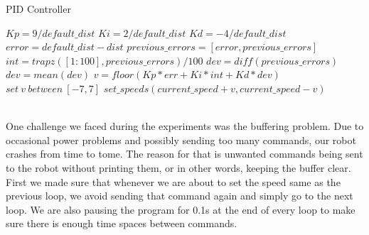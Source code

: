 \documentclass[]{article}
\begin{document}
\begin{center}
\begin{algorithm}                      %
\caption{PID Controller}          %
\label{alg1}                           %
\begin{algorithmic}                    %

    \STATE $Kp = 9/default\_dist$ 
    \STATE $Ki = 2/default\_dist$ 
    \STATE $Kd = -4/default\_dist$ 
    \STATE 
    \STATE $error = default\_dist - dist$ 
    \STATE
    \STATE $previous\_errors = [error, previous\_errors]$ 
    \STATE $int = trapz([1:100], previous\_errors)/100$ 
    \STATE
    \STATE $dev = diff(previous\_errors)$ 
    \STATE $dev = mean(dev)$
    \STATE
    \STATE $v = floor(Kp*err + Ki*int + Kd*dev)$ 
    \STATE $set \ v \ between \ [-7,7]$
    \STATE $set\_speeds(current\_speed+v, current\_speed-v)$
\end{algorithmic}
\end{algorithm}
\end{center}\\
One challenge we faced during the experiments was the buffering problem. Due to occasional power problems and possibly sending too many commands, our robot crashes from time to tome. The reason for that is unwanted commands being sent to the robot without printing them, or in other words, keeping the buffer clear. First we made sure that whenever we are about to set the speed same as the previous loop, we avoid sending that command again and simply go to the next loop. We are also pausing the program for 0.1s at the end of every loop to make sure there is enough time spaces between commands.    
\end{document}
